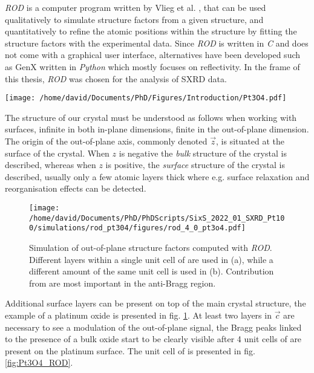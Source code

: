 \textit{ROD} is a computer program written by Vlieg et al. \parencite*{Vlieg2000}, that can be used qualitatively to simulate structure factors from a given structure, and quantitatively to refine the atomic positions within the structure by fitting the structure factors with the experimental data.
Since \textit{ROD} is written in \textit{C} and does not come with a graphical user interface, alternatives have been developed such as GenX \parencite{Bjorck2007, Glavic2022} written in \textit{Python} which mostly focuses on reflectivity.
In the frame of this thesis, \textit{ROD} was chosen for the analysis of SXRD data.

\begin{SCfigure}
    \centering
    \texttt{[image: /home/david/Documents/PhD/Figures/Introduction/Pt3O4.pdf]}
    \caption{
         bulk unit cell.
        Platinum atoms are situated on the faces on the cubic unit cell (e.g. $(0, 1/2, 1/4)$, $(0, 1/2, 3/4)$), while the eight oxygen atoms are inside the unit cell at the positions $(1/4, 1/4, z)$, $(1/4, 2/4, z)$, $(2/4, 1/4, z)$, $(2/4, 2/4, z)$ for $z=1/4$ and $z=3/4$.
    }
    \label{fig:Pt3O4_ROD}
\end{SCfigure}

The structure of our crystal must be understood as follows when working with surfaces, infinite in both in-plane dimensions, finite in the out-of-plane dimension.
The origin of the out-of-plane axis, commonly denoted $\vec{z}$, is situated at the surface of the crystal.
When $z$ is negative the \textit{bulk} structure of the crystal is described, whereas when $z$ is positive, the \textit{surface} structure of the crystal is described, usually only a few atomic layers thick where e.g. surface relaxation and reorganisation effects can be detected.

\begin{figure}[!htb]
    \texttt{[image: /home/david/Documents/PhD/PhDScripts/SixS\_2022\_01\_SXRD\_Pt100/simulations/rod\_pt304/figures/rod\_4\_0\_pt3o4.pdf]}
    \caption{
        Simulation of out-of-plane structure factors computed with \textit{ROD}.
        Different layers within a single unit cell of  are used in (a), while a different amount of the same  unit cell is used in (b).
        Contribution from  are most important in the anti-Bragg region.
    }
    \label{fig:SimROD}
\end{figure}

Additional surface layers can be present on top of the main crystal structure, the example of a  platinum oxide is presented in fig. \ref{fig:SimROD}.
At least two layers in $\vec{c}$ are necessary to see a modulation of the out-of-plane signal, the Bragg peaks linked to the presence of a bulk oxide start to be clearly visible after 4 unit cells of  are present on the platinum surface.
The unit cell of  is presented in fig. \ref{fig:Pt3O4_ROD}.


